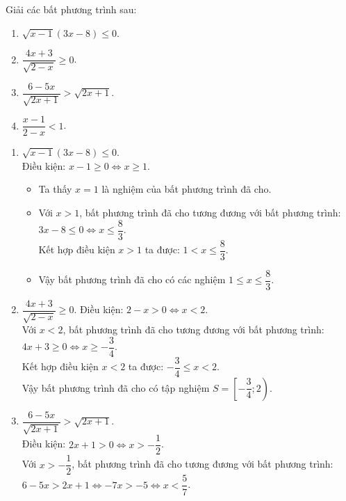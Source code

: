 \begin{vd}%
	Giải các bất phương trình sau:
	\begin{multicols}{2}
		\begin{enumerate}
			\item $\sqrt{x-1}(3x - 8) \leq 0$.
			\item $\dfrac{4x + 3}{\sqrt{2-x}} \geq 0$.
			\item $\dfrac{6-5x}{\sqrt{2x+1}} > \sqrt{2x+1}$.
			\item $\dfrac{x-1}{2-x} < 1$.
		\end{enumerate}
	\end{multicols}
	\loigiai
	{
		\begin{enumerate}
			\item $\sqrt{x-1}(3x - 8) \leq 0$.\\
			Điều kiện: $x-1 \geq 0 \Leftrightarrow x \geq 1$.
			\begin{itemize}
				\item Ta thấy $x = 1$ là nghiệm của bất phương trình đã cho.
				\item Với $x > 1$, bất phương trình đã cho tương đương với bất phương trình:\\
				$3x - 8 \leq 0 \Leftrightarrow x \leq \dfrac{8}{3}$.\\
				Kết hợp điều kiện $x > 1$ ta được: $1 < x \leq \dfrac{8}{3}$.
				\item Vậy bất phương trình đã cho có các nghiệm $1 \leq x \leq \dfrac{8}{3}$.
			\end{itemize}
			\item $\dfrac{4x + 3}{\sqrt{2-x}} \geq 0$.
			Điều kiện: $2 - x > 0 \Leftrightarrow x < 2$.\\
			Với $x < 2$, bất phương trình đã cho tương đương với bất phương trình:\\
			$4x +3 \geq 0 \Leftrightarrow x \geq -\dfrac{3}{4}$.\\
			Kết hợp điều kiện $x < 2$ ta được: $-\dfrac{3}{4} \leq x <2$.\\
			Vậy bất phương trình đã cho có tập nghiệm $S = \left[-\dfrac{3}{4};2 \right)$.
			\item $\dfrac{6-5x}{\sqrt{2x+1}} > \sqrt{2x+1}$.\\
			Điều kiện: $2x + 1 > 0 \Leftrightarrow x > -\dfrac{1}{2}$.\\
			Với $x > -\dfrac{1}{2}$, bất phương trình đã cho tương đương với bất phương trình:\\
			$6-5x > 2x+1 \Leftrightarrow -7x > -5 \Leftrightarrow x<\dfrac{5}{7}$.\\

\end{enumerate}}
\end{vd}
